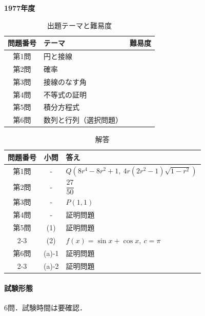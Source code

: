 \documentclass[../../main.tex]{subfiles}
\begin{document}
\begin{center}
  {\fontsize{48pt}{58pt}\selectfont \textbf{1977}\normalsize\textbf{年度}}
\end{center}

\begin{table}[htb]
  \centering
  \caption{出題テーマと難易度}
  \begin{tabular}{|c|p{9cm}|c|}
    \hline
    \textbf{問題番号} & \textbf{テーマ} & \textbf{難易度} \\
    \hline
    第1問 & 円と接線 & \\
    \hline
    第2問 & 確率 & \\
    \hline
    第3問 & 接線のなす角 & \\
    \hline
    第4問 & 不等式の証明 & \\
    \hline
    第5問 & 積分方程式 & \\
    \hline
    第6問 & 数列と行列（選択問題） & \\
    \hline
  \end{tabular}
\end{table}

\begin{table}[htb]
  \centering
  \caption{解答}
  \renewcommand{\arraystretch}{1.4}
  \begin{tabular}{|c|c|p{9cm}|}
    \hline
    \textbf{問題番号} & \textbf{小問} & \textbf{答え} \\
    \hline
    第1問 & - & $Q\left(8r^4-8r^2+1,\ 4r(2r^2-1)\sqrt{1-r^2}\right)$ \\
    \hline
    第2問 & - & $\dfrac{27}{50}$ \\
    \hline
    第3問 & - & $P(1,1)$ \\
    \hline
    第4問 & - & 証明問題 \\
    \hline
    第5問 & (1) & 証明問題 \\
    \cline{2-3}
    & (2) & $f(x)=\sin x+\cos x,\ c=\pi$ \\
    \hline
    第6問 & (a)-1 & 証明問題 \\
    \cline{2-3}
    & (a)-2 & 証明問題 \\
    \hline
  \end{tabular}
\end{table}

\paragraph{試験形態}
6問．試験時間は要確認．
\end{document}
